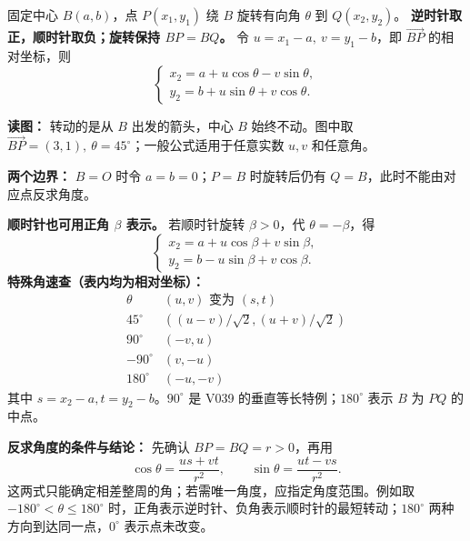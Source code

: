 \begin{statementbox}
固定中心 $B(a,b)$，点 $P(x_1,y_1)$ 绕 $B$ 旋转有向角 $\theta$ 到 $Q(x_2,y_2)$。
\textbf{逆时针取正，顺时针取负；旋转保持 $BP=BQ$。}
令 $u=x_1-a,\ v=y_1-b$，即 $\overrightarrow{BP}$ 的相对坐标，则
\[
\boxed{\begin{cases}
x_2=a+u\cos\theta-v\sin\theta,\\
y_2=b+u\sin\theta+v\cos\theta.
\end{cases}}
\]

\textbf{读图：} 转动的是从 $B$ 出发的箭头，中心 $B$ 始终不动。图中取
$\overrightarrow{BP}=(3,1),\ \theta=45^\circ$；一般公式适用于任意实数 $u,v$ 和任意角。

\textbf{两个边界：} $B=O$ 时令 $a=b=0$；$P=B$ 时旋转后仍有 $Q=B$，此时不能由对应点反求角度。
\end{statementbox}
\clearpage
\begin{statementbox}
\textbf{顺时针也可用正角 $\beta$ 表示。} 若顺时针旋转 $\beta>0$，代 $\theta=-\beta$，得
\[
\boxed{\begin{cases}
x_2=a+u\cos\beta+v\sin\beta,\\
y_2=b-u\sin\beta+v\cos\beta.
\end{cases}}
\]
\textbf{特殊角速查（表内均为相对坐标）：}
\[
\begin{array}{c|c}
\theta&(u,v)\text{ 变为 }(s,t)\\\hline
45^\circ&((u-v)/\sqrt2,(u+v)/\sqrt2)\\[3pt]
90^\circ&(-v,u)\\[3pt]
-90^\circ&(v,-u)\\[3pt]
180^\circ&(-u,-v)
\end{array}
\]
其中 $s=x_2-a,t=y_2-b$。$90^\circ$ 是 V039 的垂直等长特例；$180^\circ$ 表示 $B$ 为 $PQ$ 的中点。

\textbf{反求角度的条件与结论：} 先确认 $BP=BQ=r>0$，再用
\[
\boxed{\cos\theta=\frac{us+vt}{r^2},\qquad
\sin\theta=\frac{ut-vs}{r^2}.}
\]
这两式只能确定相差整周的角；若需唯一角度，应指定角度范围。例如取
$-180^\circ<\theta\le180^\circ$ 时，正角表示逆时针、负角表示顺时针的最短转动；$180^\circ$ 两种方向到达同一点，$0^\circ$ 表示点未改变。
\end{statementbox}
